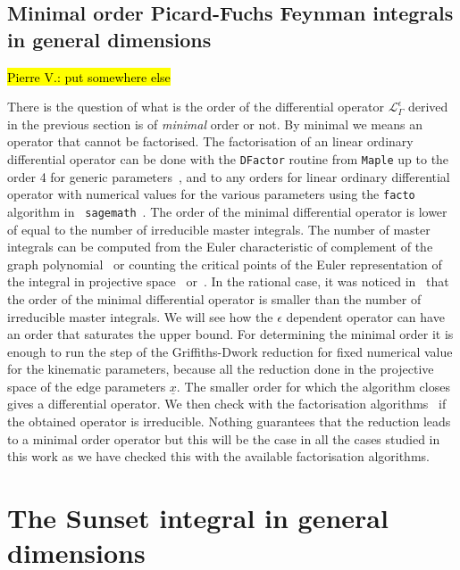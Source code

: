 \documentclass[a4paper,12pt]{article}
\numberwithin{equation}{section}
\numberwithin{figure}{section}
\newcommand{\pvnote}[1]{\sethlcolor{bubblegum} \protect\hl{Pierre V.: #1} \sethlcolor{yellow}}
\begin{document}
 \subsection{Minimal order Picard-Fuchs Feynman integrals in general dimensions}
\label{sec:results}
\pvnote{put somewhere else}

There is the question of what is the order of the differential
operator  $\mathscr{L}_\Gamma^\epsilon$  derived in the previous
section is of \emph{minimal} order or not.  By minimal we means an
operator that cannot be factorised. The factorisation of an linear ordinary
differential operator can be done with the {\tt DFactor} routine from
{\tt Maple} up to the order 4 for generic parameters~\cite{PutSinger,vanHoeij}, and to any
orders for linear  ordinary
differential operator with numerical values for the various parameters
using the {\tt facto} algorithm in {\tt
  sagemath}~\cite{chyzak2022symbolic,goyer2021sage}.
The order of the minimal differential operator is lower of equal to
the number of irreducible master integrals. The number of master
integrals  can be computed from the Euler
characteristic of complement of the graph polynomial~\cite{Bitoun:2017nre} or counting the
critical points of the Euler representation of the integral in
projective
space~\cite{Lee:2013hzt,Cacciatori:2021nli,Agostini:2022cgv} or~\cite{Mastrolia:2018uzb,Frellesvig:2019uqt}.   In the rational case, it was noticed
in~\cite{Bloch:2013tra,Bloch:2016izu,Bloch:2014qca,Lairez:2022zkj} that the order of the minimal differential operator is
smaller than the number of irreducible master integrals. We will see
how the $\epsilon$ dependent operator can have an order that saturates
the upper bound.
 For
determining the minimal order it is enough to run the step of the
Griffiths-Dwork reduction for fixed numerical value for the kinematic
parameters, because all the reduction done in the projective space of
the edge parameters $\underline x$. The smaller order for which the
algorithm closes gives a differential operator. We then check with the
factorisation algorithms~\cite{chyzak2022symbolic,goyer2021sage} if
the obtained operator is irreducible. Nothing guarantees that the reduction leads to
a minimal order operator but this will be  the case in all the cases
studied in this work as we have checked this with the available
factorisation algorithms.

\section{The Sunset integral in general dimensions}
\end{document}
